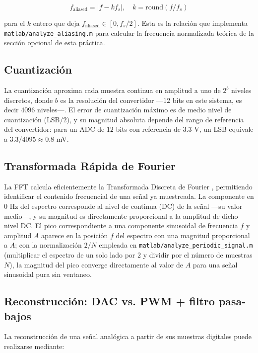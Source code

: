 \begin{equation}
f_{\text{aliased}} = \left| f - k f_s \right|, \quad k = \text{round}(f/f_s)
\label{eq:aliasing}
\end{equation}

para el $k$ entero que deja $f_{\text{aliased}} \in [0, f_s/2]$. Esta es la relación que implementa \texttt{matlab/analyze\_aliasing.m} para calcular la frecuencia normalizada teórica de la sección opcional de esta práctica.

\subsection{Cuantización}

La cuantización aproxima cada muestra continua en amplitud a uno de $2^b$ niveles discretos, donde $b$ es la resolución del convertidor —$12$ bits en este sistema, es decir $4096$ niveles—. El error de cuantización máximo es de medio nivel de cuantización (LSB/2), y su magnitud absoluta depende del rango de referencia del convertidor: para un ADC de $12$ bits con referencia de $3.3$ V, un LSB equivale a $3.3/4095 \approx 0.8$ mV.

\subsection{Transformada Rápida de Fourier}

La FFT calcula eficientemente la Transformada Discreta de Fourier \cite{lyons}, permitiendo identificar el contenido frecuencial de una señal ya muestreada. La componente en $0$ Hz del espectro corresponde al nivel de continua (DC) de la señal —su valor medio—, y su magnitud es directamente proporcional a la amplitud de dicho nivel DC. El pico correspondiente a una componente sinusoidal de frecuencia $f$ y amplitud $A$ aparece en la posición $f$ del espectro con una magnitud proporcional a $A$; con la normalización $2/N$ empleada en \texttt{matlab/analyze\_periodic\_signal.m} (multiplicar el espectro de un solo lado por $2$ y dividir por el número de muestras $N$), la magnitud del pico converge directamente al valor de $A$ para una señal sinusoidal pura sin ventaneo.

\subsection{Reconstrucción: DAC vs. PWM + filtro pasa-bajos}
\label{sec:reconstruccion}

La reconstrucción de una señal analógica a partir de sus muestras digitales puede realizarse mediante:

